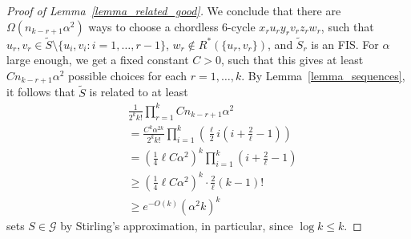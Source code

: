 \documentclass{article}
\theoremstyle{plain}
\theoremstyle{remark}
\theoremstyle{plain}
\numberwithin{equation}{section}
\begin{document}
\begin{proof}[Proof of Lemma~\ref{lemma_related_good}]
		We conclude that there are $\Omega(n_{k-r+1}\alpha^2)$ ways to choose a chordless $6$-cycle $x_ru_ry_rv_rz_rw_r$, such that $u_r,v_r\in\widetilde{S}\setminus\{u_i,v_i:i=1,\ldots,r-1\}$, $w_r\not\in R^*(\{u_r,v_r\})$, and $\widetilde{S}_r$ is an FIS. For $\alpha$ large enough, we get a fixed constant $C>0$, such that this gives at least $Cn_{k-r+1}\alpha^2$ possible choices for each $r=1,\ldots,k$. By Lemma~\ref{lemma_sequences}, it follows that $\widetilde{S}$ is related to at least
		\begin{align}
			&\frac1{2^kk!}\prod_{r=1}^kCn_{k-r+1}\alpha^2
			\\&=\frac{C^k\alpha^{2k}}{2^kk!}\prod_{i=1}^k\left(\tfrac{\ell}2i\left(i+\tfrac2{\ell}-1\right)\right)
			\\&=\left(\tfrac14\ell C\alpha^2\right)^k\prod_{i=1}^k\left(i+\tfrac{2}{\ell}-1\right)
			\\&\geq\left(\tfrac14\ell C\alpha^2\right)^k\cdot\tfrac{2}{\ell}(k-1)!
			\\&\geq e^{-O(k)}(\alpha^2k)^k
		\end{align}
		sets $S\in\mathcal{G}$ by Stirling's approximation, in particular, since $\log k\leq k$.
	\end{proof}
	
\end{document}
